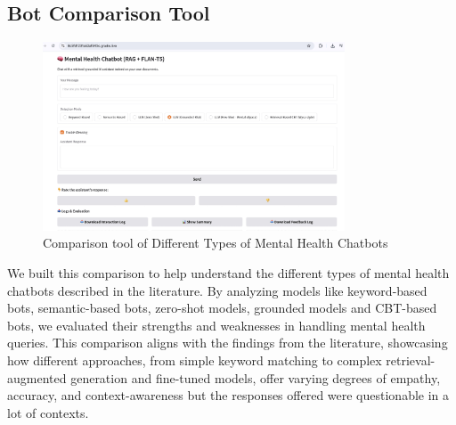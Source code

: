 \subsection{Bot Comparison Tool} 
\begin{figure}[htbp]
    \centering
    \includegraphics[width=0.8\textwidth]{bot_comparison_tool.jpeg}
    \caption{Comparison tool of Different Types of Mental Health Chatbots}
    \label{fig:bot_comparison}
\end{figure}
We built this comparison to help understand the different types of mental health chatbots described in the literature. By analyzing models like keyword-based bots, semantic-based bots, zero-shot models, grounded models and CBT-based bots, we evaluated their strengths and weaknesses in handling mental health queries. This comparison aligns with the findings from the literature, showcasing how different approaches, from simple keyword matching to complex retrieval-augmented generation and fine-tuned models, offer varying degrees of empathy, accuracy, and context-awareness but the responses offered were questionable in a lot of contexts. 





